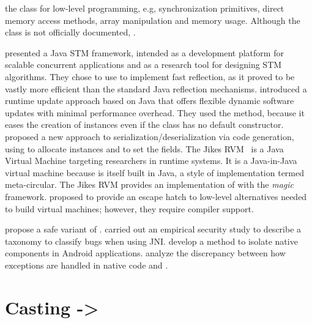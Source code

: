  the \smu{} class for low-level programming, e.g, synchronization primitives, direct memory access methods, array manipulation and memory usage.
Although the \smu{} class is not officially documented,
.

\cite{korlandNoninvasiveConcurrencyJava2010} presented a Java STM framework, intended as a development platform for scalable concurrent applications and as a research tool for designing STM algorithms.
They chose to use \smu{} to implement fast reflection, as it proved to be vastly more efficient than the standard Java reflection mechanisms.
\cite{pukallFlexibleDynamicSoftware} introduced a runtime update approach based on Java that offers flexible dynamic software updates with minimal performance overhead.
They used the  method, because it eases the creation of instances even if the class has no default constructor.
\cite{gligoricCoDeSeFastDeserialization2011} proposed a new approach to serialization/deserialization via code generation, using \smu{} to allocate instances and to set the fields.
The Jikes RVM~\cite{alpernJikesResearchVirtual2005} is a Java Virtual Machine targeting researchers in runtime systems.
It is a Java-in-Java virtual machine because is itself built in Java, a style of implementation termed meta-circular.
The Jikes RVM provides an implementation of \smu{} with the \emph{magic} framework.
\cite{framptonDemystifyingMagicHighlevel2009} proposed  to provide an escape hatch to low-level alternatives needed to build virtual machines; however, they require compiler support.

\cite{tanSafeJavaNative2006} propose a safe variant of \jni{}.
\cite{tanEmpiricalSecurityStudy2008,kondohFindingBugsJava2008} carried out an empirical security study to describe a taxonomy to classify bugs when using JNI.
\cite{sunNativeGuardProtectingAndroid2014} develop a method to isolate native components in Android applications.
\cite{liFindingBugsExceptional2009} analyze the discrepancy between how exceptions are handled in native code and \java{}.


\section{Casting -> }
\label{sec:lr:casting}

